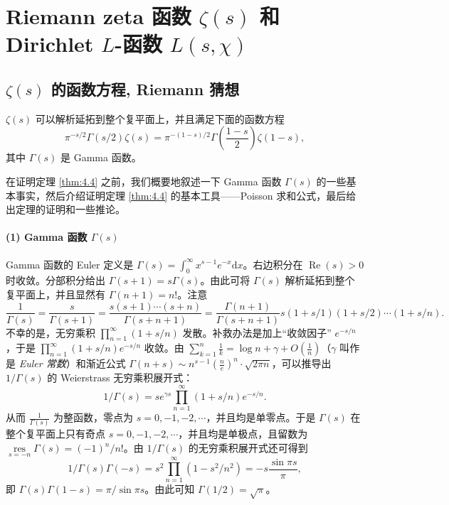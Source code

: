 \section{\texorpdfstring{Riemann zeta 函数 $\zeta(s)$ 和 Dirichlet $L$-函数 $L(s,\chi)$}{Riemann zeta 函数 zeta(s) 和 Dirichlet L-函数 L(s,chi)}}\label{sec:ch4-s2}

\subsection{\texorpdfstring{$\zeta(s)$}{zeta(s)} 的函数方程, Riemann 猜想}\label{sec:ch4-s2-1}

\begin{theorem}\label{thm:4.4}
$\zeta(s)$ 可以解析延拓到整个复平面上，并且满足下面的函数方程
\[
  \pi^{-s/2}\Gamma(s/2)\zeta(s)=\pi^{-(1-s)/2}\Gamma\left(\frac{1-s}{2}\right)\zeta(1-s),
\]
其中 $\Gamma(s)$ 是 Gamma 函数。
\end{theorem}

在证明定理 \ref{thm:4.4} 之前，我们概要地叙述一下 Gamma 函数 $\Gamma(s)$ 的一些基本事实，然后介绍证明定理 \ref{thm:4.4} 的基本工具——Poisson 求和公式，最后给出定理的证明和一些推论。

\paragraph{(1) Gamma 函数 $\Gamma(s)$}

Gamma 函数的 Euler 定义是 $\Gamma(s)=\int_0^{\infty}x^{s-1}e^{-x}\mathrm{d}x$。右边积分在 $\operatorname{Re}(s)>0$ 时收敛。分部积分给出 $\Gamma(s+1)=s\Gamma(s)$。由此可将 $\Gamma(s)$ 解析延拓到整个复平面上，并且显然有 $\Gamma(n+1)=n!$。注意
\[
  \frac{1}{\Gamma(s)}=\frac{s}{\Gamma(s+1)}=\frac{s(s+1)\cdots(s+n)}{\Gamma(s+n+1)}
  =\frac{\Gamma(n+1)}{\Gamma(s+n+1)}s(1+s/1)(1+s/2)\cdots(1+s/n).
\]
不幸的是，无穷乘积 $\prod_{n=1}^{\infty}(1+s/n)$ 发散。补救办法是加上``收敛因子'' $e^{-s/n}$，于是 $\prod_{n=1}^{\infty}(1+s/n)e^{-s/n}$ 收敛。由 $\sum_{k=1}^{n}\frac{1}{k}=\log n+\gamma+O\left(\frac{1}{n}\right)$（$\gamma$ 叫作是 \emph{Euler 常数}）和渐近公式 $\Gamma(n+s)\sim n^{s-1}\left(\frac{n}{e}\right)^n\cdot\sqrt{2\pi n}$，可以推导出 $1/\Gamma(s)$ 的 Weierstrass 无穷乘积展开式：
\[
  1/\Gamma(s)=se^{\gamma s}\prod_{n=1}^{\infty}(1+s/n)e^{-s/n}.
\]
从而 $\frac{1}{\Gamma(s)}$ 为整函数，零点为 $s=0,-1,-2,\cdots$，并且均是单零点。于是 $\Gamma(s)$ 在整个复平面上只有奇点 $s=0,-1,-2,\cdots$，并且均是单极点，且留数为 $\underset{s=-n}{\operatorname{res}}\Gamma(s)=(-1)^n/n!$。由 $1/\Gamma(s)$ 的无穷乘积展开式还可得到
\[
  1/\Gamma(s)\Gamma(-s)=s^2\prod_{n=1}^{\infty}(1-s^2/n^2)=-s\frac{\sin\pi s}{\pi},
\]
即 $\Gamma(s)\Gamma(1-s)=\pi/\sin\pi s$。由此可知 $\Gamma(1/2)=\sqrt{\pi}$。

